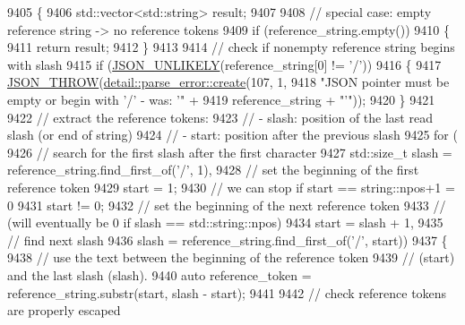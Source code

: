 \begin{DoxyCode}
9405     \{
9406         std::vector<std::string> result;
9407 
9408         \textcolor{comment}{// special case: empty reference string -> no reference tokens}
9409         \textcolor{keywordflow}{if} (reference\_string.empty())
9410         \{
9411             \textcolor{keywordflow}{return} result;
9412         \}
9413 
9414         \textcolor{comment}{// check if nonempty reference string begins with slash}
9415         \textcolor{keywordflow}{if} (\hyperlink{json_8hpp_ab77582407c64944e7db1ea95ab520253}{JSON\_UNLIKELY}(reference\_string[0] != \textcolor{charliteral}{'/'}))
9416         \{
9417             \hyperlink{json_8hpp_a6c274f6db2e65c1b66c7d41b06ad690f}{JSON\_THROW}(\hyperlink{classnlohmann_1_1detail_1_1parse__error_a9fd60ad6bce80fd99686ad332faefd37}{detail::parse\_error::create}(107, 1,
9418                                                    \textcolor{stringliteral}{"JSON pointer must be empty or begin with '/' - was: '"} 
      +
9419                                                    reference\_string + \textcolor{stringliteral}{"'"}));
9420         \}
9421 
9422         \textcolor{comment}{// extract the reference tokens:}
9423         \textcolor{comment}{// - slash: position of the last read slash (or end of string)}
9424         \textcolor{comment}{// - start: position after the previous slash}
9425         \textcolor{keywordflow}{for} (
9426             \textcolor{comment}{// search for the first slash after the first character}
9427             std::size\_t slash = reference\_string.find\_first\_of(\textcolor{charliteral}{'/'}, 1),
9428             \textcolor{comment}{// set the beginning of the first reference token}
9429             start = 1;
9430             \textcolor{comment}{// we can stop if start == string::npos+1 = 0}
9431             start != 0;
9432             \textcolor{comment}{// set the beginning of the next reference token}
9433             \textcolor{comment}{// (will eventually be 0 if slash == std::string::npos)}
9434             start = slash + 1,
9435             \textcolor{comment}{// find next slash}
9436             slash = reference\_string.find\_first\_of(\textcolor{charliteral}{'/'}, start))
9437         \{
9438             \textcolor{comment}{// use the text between the beginning of the reference token}
9439             \textcolor{comment}{// (start) and the last slash (slash).}
9440             \textcolor{keyword}{auto} reference\_token = reference\_string.substr(start, slash - start);
9441 
9442             \textcolor{comment}{// check reference tokens are properly escaped}

\end{DoxyCode}
